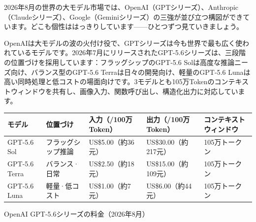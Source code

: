


2026年8月の世界の大モデル市場では、OpenAI（GPTシリーズ）、Anthropic（Claudeシリーズ）、Google（Geminiシリーズ）の三強が並び立つ構図ができています。どこも個性ははっきりしています——ひとつずつ見ていきましょう。


OpenAIは大モデルの波の火付け役で、GPTシリーズは今も世界で最も広く使われているモデルです。2026年7月にリリースされたGPT-5.6シリーズは、三段階の位置づけを採用しています：フラッグシップのGPT-5.6 Solは高度な推論ニーズ向け、バランス型のGPT-5.6 Terraは日々の開発向け、軽量のGPT-5.6 Lunaは高い同時処理と低コストの場面向けです。3モデルとも105万Tokenのコンテキストウィンドウを共有し、画像入力、関数呼び出し、構造化出力に対応しています。

\begin{center}
\begin{tabularx}{\linewidth}{|X|X|X|X|X|}
\hline
\textbf{モデル} & \textbf{位置づけ} & \textbf{入力（/100万Token）} & \textbf{出力（/100万Token）} & \textbf{コンテキストウィンドウ} \tabularnewline
\hline
GPT-5.6 Sol & フラッグシップ推論 & US\$5.00（約36元） & US\$30.00（約217元） & 105万トークン \tabularnewline
GPT-5.6 Terra & バランス·日常 & US\$2.50（約18元） & US\$15.00（約109元） & 105万トークン \tabularnewline
GPT-5.6 Luna & 軽量·低コスト & US\$1.00（約7元） & US\$6.00（約44元） & 105万トークン \tabularnewline
\hline
\end{tabularx}
\end{center}

\begin{center}\small\color{gray}OpenAI GPT-5.6シリーズの料金（2026年8月）\end{center}


